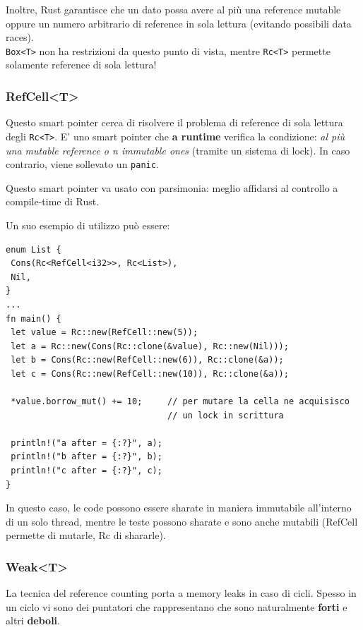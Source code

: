 \documentclass{article}
\begin{document}
Inoltre, Rust garantisce che un dato possa avere al più una reference mutable oppure un numero arbitrario di reference in sola lettura (evitando possibili data races).\\
\texttt{Box<T>} non ha restrizioni da questo punto di vista, mentre \texttt{Rc<T>} permette solamente reference di sola lettura!

\pagebreak

\subsubsection*{RefCell<T>}
Questo smart pointer cerca di risolvere il problema di reference di sola lettura degli \texttt{Rc<T>}. E' uno smart pointer che \textbf{a runtime} verifica la condizione: \textit{al più una mutable reference o n immutable ones} (tramite un sistema di lock). In caso contrario, viene sollevato un \texttt{panic}.

Questo smart pointer va usato con parsimonia: meglio affidarsi al controllo a compile-time di Rust.

Un suo esempio di utilizzo può essere:
\begin{tcolorbox}
\begin{verbatim}
enum List {
 Cons(Rc<RefCell<i32>>, Rc<List>),
 Nil,
}
...
fn main() {
 let value = Rc::new(RefCell::new(5));
 let a = Rc::new(Cons(Rc::clone(&value), Rc::new(Nil)));
 let b = Cons(Rc::new(RefCell::new(6)), Rc::clone(&a));
 let c = Cons(Rc::new(RefCell::new(10)), Rc::clone(&a));

 *value.borrow_mut() += 10;     // per mutare la cella ne acquisisco 
                                // un lock in scrittura

 println!("a after = {:?}", a);
 println!("b after = {:?}", b);
 println!("c after = {:?}", c);
}
\end{verbatim}
\end{tcolorbox}
In questo caso, le code possono essere sharate in maniera immutabile all'interno di un solo thread, mentre le teste possono sharate e sono anche mutabili (RefCell permette di mutarle, Rc di shararle).

\subsubsection*{Weak<T>}
La tecnica del reference counting porta a memory leaks in caso di cicli. Spesso in un ciclo vi sono dei puntatori che rappresentano che sono naturalmente \textbf{forti} e altri \textbf{deboli}.
\end{document}

